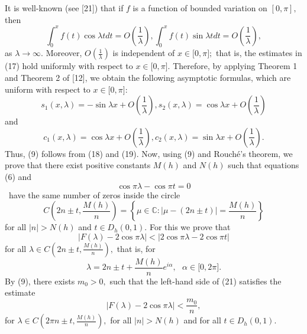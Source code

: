 \documentclass{article}%
\begin{document}
It is well-known (see [21]) that if $f$ is a function of bounded variation on
$[0,\pi],$ then
\begin{equation}
\int_{0}^{x}f(t)\cos\lambda tdt=O\left(  \frac{1}{\lambda}\right)  ,\text{
}\int_{0}^{x}f(t)\sin\lambda tdt=O\left(  \frac{1}{\lambda}\right)  , \tag{17}%
\end{equation}
as $\lambda\rightarrow\infty$. Moreover, $O\left(  \frac{1}{\lambda}\right)  $
is independent of $x\in\lbrack0,\pi];$ that is, the estimates in (17) hold
uniformly with respect to $x\in\lbrack0,\pi].$ Therefore, by applying Theorem
1 and Theorem 2 of [12], we obtain the following asymptotic formulas, which
are uniform with respect to $x\in\lbrack0,\pi]$:
\begin{equation}
s_{1}(x,\lambda)=-\sin\lambda x+O\left(  \frac{1}{\lambda}\right)  ,\text{
}s_{2}(x,\lambda)=\cos\lambda x+O\left(  \frac{1}{\lambda}\right)  \tag{18}%
\end{equation}
and
\begin{equation}
c_{1}(x,\lambda)=\cos\lambda x+O\left(  \frac{1}{\lambda}\right)  ,\text{
}c_{2}(x,\lambda)=\sin\lambda x+O\left(  \frac{1}{\lambda}\right)  . \tag{19}%
\end{equation}
Thus, (9) follows from (18) and (19). Now, using (9) and Rouch\'{e}'s theorem,
we prove that there exist positive constants $M(h)$ and $N(h)$ such that
equations (6) and%
\begin{equation}
\cos\pi\lambda-\cos\pi t=0 \tag{20}%
\end{equation}
\ have the same number of zeros inside the circle
\[
C(2n\pm t,\frac{M(h)}{n})=\left\{  \mu\in\mathbb{C}:\left\vert \mu-(2n\pm
t)\right\vert =\frac{M(h)}{n}\right\}
\]
for all $\left\vert n\right\vert >N(h)$ and $t\in D_{h}(0,1).$ For this we
prove that
\begin{equation}
\left\vert F(\lambda)-2\cos\pi\lambda\right\vert <\left\vert 2\cos\pi
\lambda-2\cos\pi t\right\vert \tag{21}%
\end{equation}
for all $\lambda\in C(2n\pm t,\frac{M(h)}{n}),$ that is, for
\[
\lambda=2n\pm t+\frac{M(h)}{n}e^{i\alpha},\text{ }\alpha\in\lbrack0,2\pi].
\]
By (9), there exists $m_{0}>0,$ such that the left-hand side of (21) satisfies
the estimate
\begin{equation}
\left\vert F(\lambda)-2\cos\pi\lambda\right\vert <\frac{m_{0}}{n}, \tag{22}%
\end{equation}
for $\lambda\in C(2\pi n\pm t,\frac{M(h)}{n}),$ for all $\left\vert
n\right\vert >N(h)$ and for all $t\in D_{h}(0,1).$
\end{document}
